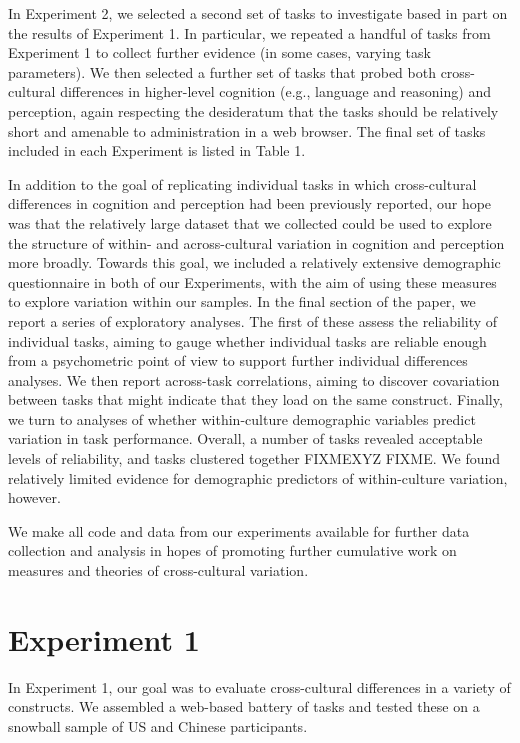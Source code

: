 \documentclass[
  man]{apa6}
\begin{document}
In Experiment 2, we selected a second set of tasks to investigate based in part on the results of Experiment 1. In particular, we repeated a handful of tasks from Experiment 1 to collect further evidence (in some cases, varying task parameters). We then selected a further set of tasks that probed both cross-cultural differences in higher-level cognition (e.g., language and reasoning) and perception, again respecting the desideratum that the tasks should be relatively short and amenable to administration in a web browser. The final set of tasks included in each Experiment is listed in Table 1.

In addition to the goal of replicating individual tasks in which cross-cultural differences in cognition and perception had been previously reported, our hope was that the relatively large dataset that we collected could be used to explore the structure of within- and across-cultural variation in cognition and perception more broadly. Towards this goal, we included a relatively extensive demographic questionnaire in both of our Experiments, with the aim of using these measures to explore variation within our samples. In the final section of the paper, we report a series of exploratory analyses. The first of these assess the reliability of individual tasks, aiming to gauge whether individual tasks are reliable enough from a psychometric point of view to support further individual differences analyses. We then report across-task correlations, aiming to discover covariation between tasks that might indicate that they load on the same construct. Finally, we turn to analyses of whether within-culture demographic variables predict variation in task performance. Overall, a number of tasks revealed acceptable levels of reliability, and tasks clustered together FIXMEXYZ FIXME. We found relatively limited evidence for demographic predictors of within-culture variation, however.

We make all code and data from our experiments available for further data collection and analysis in hopes of promoting further cumulative work on measures and theories of cross-cultural variation.

\hypertarget{experiment-1}{%
\section{Experiment 1}\label{experiment-1}}

In Experiment 1, our goal was to evaluate cross-cultural differences in a variety of constructs. We assembled a web-based battery of tasks and tested these on a snowball sample of US and Chinese participants.
\end{document}

